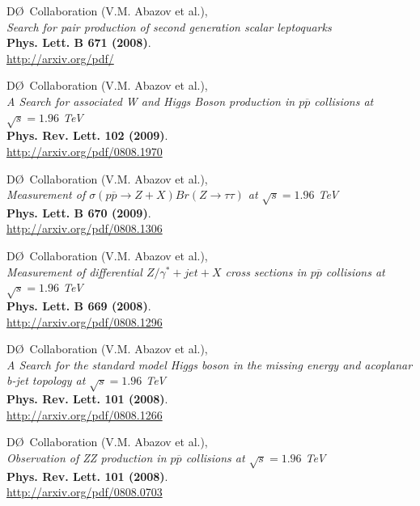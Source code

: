 \documentclass[12pt]{article}
\begin{document}
%
D\O~Collaboration (V.M. Abazov et al.), \\
\textsl{Search for pair production of second generation scalar leptoquarks}\\
\textbf{Phys. Lett. B 671 (2008)}.\\
{\small{\url{http://arxiv.org/pdf/}}}\vspace{4mm}

%
D\O~Collaboration (V.M. Abazov et al.), \\
\textsl{A Search for associated W and Higgs Boson production in $p\overline{p}$ collisions at $\sqrt{s}=1.96$ TeV}\\
\textbf{Phys. Rev. Lett. 102 (2009)}.\\
{\small{\url{http://arxiv.org/pdf/0808.1970}}}\vspace{4mm}

%
D\O~Collaboration (V.M. Abazov et al.), \\
\textsl{Measurement of $\sigma(p\overline{p}\rightarrow Z+X)Br(Z\rightarrow \tau\tau)$ at $\sqrt{s}=1.96$ TeV}\\
\textbf{Phys. Lett. B 670 (2009)}.\\
{\small{\url{http://arxiv.org/pdf/0808.1306}}}\vspace{4mm}

%
D\O~Collaboration (V.M. Abazov et al.), \\
\textsl{Measurement of differential $Z/\gamma^{*}+jet+X$ cross sections in $p\overline{p}$ collisions at $\sqrt{s}=1.96$ TeV}\\
\textbf{Phys. Lett. B 669 (2008)}.\\
{\small{\url{http://arxiv.org/pdf/0808.1296}}}\vspace{4mm}

%
D\O~Collaboration (V.M. Abazov et al.), \\
\textsl{A Search for the standard model Higgs boson in the missing energy and acoplanar b-jet topology at $\sqrt{s}=1.96$ TeV}\\
\textbf{Phys. Rev. Lett. 101 (2008)}.\\
{\small{\url{http://arxiv.org/pdf/0808.1266}}}\vspace{4mm}

%
D\O~Collaboration (V.M. Abazov et al.), \\
\textsl{Observation of ZZ production in $p\overline{p}$ collisions at $\sqrt{s}=1.96$ TeV}\\
\textbf{Phys. Rev. Lett. 101 (2008)}.\\
{\small{\url{http://arxiv.org/pdf/0808.0703}}}\vspace{4mm}
\end{document}
